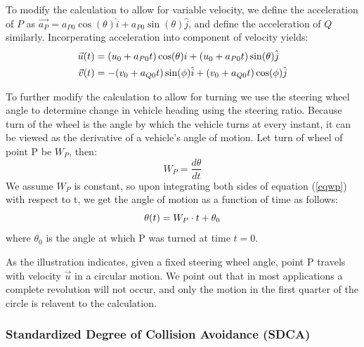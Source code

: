 \documentclass{article}
\begin{document}
To modify the calculation to allow for variable velocity, we define the acceleration of $P$ as $\vec{a_P} = a_{P0}\cos(\theta)\hat{i} + a_{P0}\sin(\theta)\hat{j}$, and define the acceleration of $Q$ similarly.  Incorperating acceleration into component of velocity yields:
\begin{align*}
    \vec{u}(t) &= (u_0 + a_{P0}t) \cos(\theta){i} + (u_0 + a_{P0}t)\sin(\theta) \hat{j} \\
    \vec{v}(t) &= -(v_0+a_{Q0}t) \sin(\phi)\hat{i} + (v_0+a_{Q0}t)\cos(\phi)\hat{j}
\notag
\end{align*}

To further modify the calculation to allow for turning we use the steering wheel angle to determine change in vehicle heading using the steering ratio. Because turn of the wheel is the angle by which the vehicle turns at every instant, it can be viewed as the derivative of a vehicle's angle of motion.  Let turn of wheel of point P be $W_P$, then:
\begin{equation}
 W_P = \frac{d\theta}{dt}   
 \label{eqwp}
\end{equation}
We assume $W_P$ is constant, so upon integrating both sides of equation (\ref{eqwp}) with respect to t, we get the angle of motion as a function of time as follows:\\
\begin{equation}
    \theta(t) = W_P \cdot t + \theta_0
    \notag
\end{equation}
where $\theta_0$ is the angle at which P was turned at time $t = 0$.\\
\begin{center}
\end{center}
As the illustration indicates, given a fixed steering wheel angle, point P travels with velocity $\vec{u}$ in a circular motion.  We point out that in most applications a complete revolution will not occur, and only the motion in the first quarter of the circle is relavent to the calculation.

\subsubsection{Standardized Degree of Collision Avoidance (SDCA)}
\end{document}
